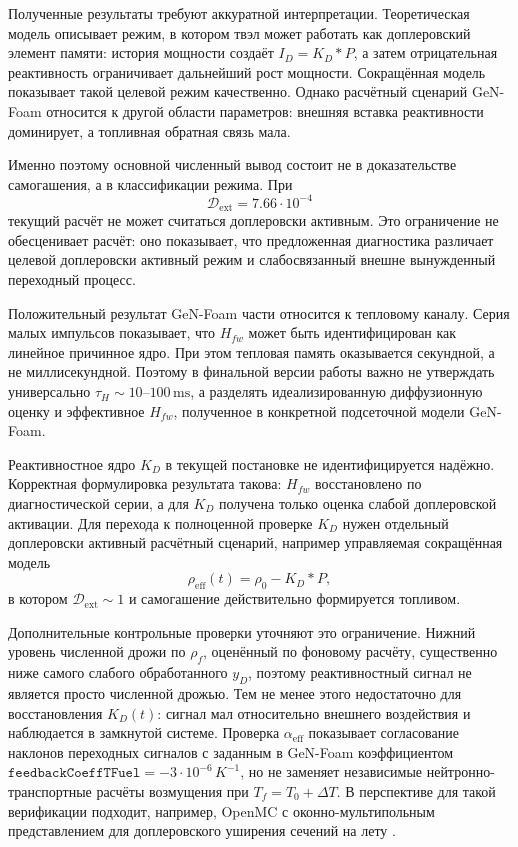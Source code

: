 \documentclass[12pt]{article}
\begin{document}
Полученные результаты требуют аккуратной интерпретации. Теоретическая модель описывает режим, в котором твэл может работать как доплеровский элемент памяти: история мощности создаёт \(I_D=K_D*P\), а затем отрицательная реактивность ограничивает дальнейший рост мощности. Сокращённая модель показывает такой целевой режим качественно. Однако расчётный сценарий GeN-Foam относится к другой области параметров: внешняя вставка реактивности доминирует, а топливная обратная связь мала.

Именно поэтому основной численный вывод состоит не в доказательстве самогашения, а в классификации режима. При
\[
\mathcal D_{\mathrm{ext}}=7.66\cdot10^{-4}
\]
текущий расчёт не может считаться доплеровски активным. Это ограничение не обесценивает расчёт: оно показывает, что предложенная диагностика различает целевой доплеровски активный режим и слабосвязанный внешне вынужденный переходный процесс.

Положительный результат GeN-Foam части относится к тепловому каналу. Серия малых импульсов показывает, что \(H_{fw}\) может быть идентифицирован как линейное причинное ядро. При этом тепловая память оказывается секундной, а не миллисекундной. Поэтому в финальной версии работы важно не утверждать универсально \(\tau_H\sim10\)--\(100\,\mathrm{ms}\), а разделять идеализированную диффузионную оценку и эффективное \(H_{fw}\), полученное в конкретной подсеточной модели GeN-Foam.

Реактивностное ядро \(K_D\) в текущей постановке не идентифицируется надёжно. Корректная формулировка результата такова: \(H_{fw}\) восстановлено по диагностической серии, а для \(K_D\) получена только оценка слабой доплеровской активации. Для перехода к полноценной проверке \(K_D\) нужен отдельный доплеровски активный расчётный сценарий, например управляемая сокращённая модель
\[
\rho_{\mathrm{eff}}(t)=
\rho_0-K_D*P,
\]
в котором \(\mathcal D_{\mathrm{ext}}\sim1\) и самогашение действительно формируется топливом.

Дополнительные контрольные проверки уточняют это ограничение. Нижний уровень численной дрожи по \(\rho_f\), оценённый по фоновому расчёту, существенно ниже самого слабого обработанного \(y_D\), поэтому реактивностный сигнал не является просто численной дрожью. Тем не менее этого недостаточно для восстановления \(K_D(t)\): сигнал мал относительно внешнего воздействия и наблюдается в замкнутой системе. Проверка \(\alpha_{\mathrm{eff}}\) показывает согласование наклонов переходных сигналов с заданным в GeN-Foam коэффициентом \(\texttt{feedbackCoeffTFuel}=-3\cdot10^{-6}\,K^{-1}\), но не заменяет независимые нейтронно-транспортные расчёты возмущения при \(T_f=T_0+\Delta T\). В перспективе для такой верификации подходит, например, OpenMC с оконно-мультипольным представлением для доплеровского уширения сечений на лету \cite{OpenMCCrossSections}.
\end{document}
